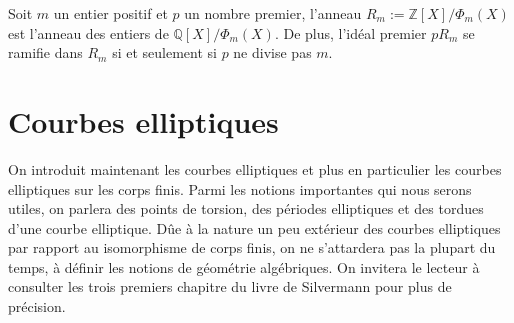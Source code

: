 \documentclass[a4paper]{article} %
\numberwithin{section}{part}
\numberwithin{equation}{section}
\newcommand\QQ{\mathbb{Q}}
\newcommand\ZZ{\mathbb{Z}}
\begin{document}
\begin{thm}
\label{th:entiercycl}
Soit $m$ un entier positif et $p$ un nombre premier, l'anneau $R_m := 
\ZZ[X]/\Phi_m(X)$ est l'anneau des entiers de $\QQ[X]/\Phi_m(X)$. De plus, 
l'idéal premier $pR_m$ se ramifie dans $R_m$ si et seulement si $p$ ne divise 
pas $m$.
\end{thm}
\section{Courbes elliptiques}
On introduit maintenant les courbes elliptiques et plus en particulier les
courbes elliptiques sur les corps finis. Parmi les notions importantes qui nous
serons utiles, on parlera des points de torsion, des périodes elliptiques et des
tordues d'une courbe elliptique. Dûe à la nature un peu extérieur des courbes
elliptiques par rapport au isomorphisme de corps finis, on ne s'attardera pas 
la plupart du temps, à définir les notions de géométrie algébriques. On invitera
le lecteur à consulter les trois premiers chapitre du livre de 
Silvermann\cite{Sil} pour plus de précision.
\end{document}
